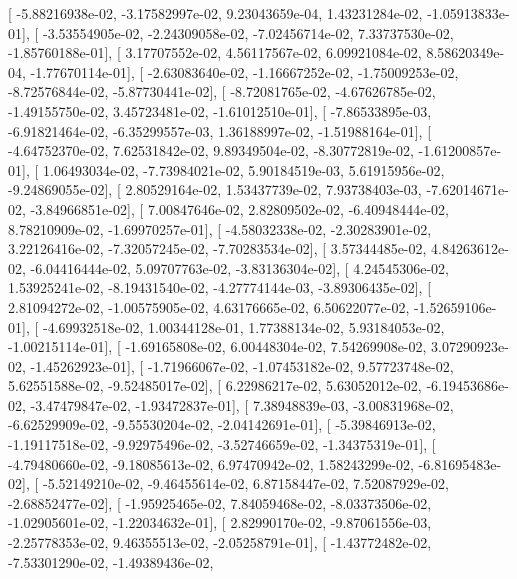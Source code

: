 \documentclass{article}
\begin{document}
       [ -5.88216938e-02,  -3.17582997e-02,   9.23043659e-04,
          1.43231284e-02,  -1.05913833e-01],
       [ -3.53554905e-02,  -2.24309058e-02,  -7.02456714e-02,
          7.33737530e-02,  -1.85760188e-01],
       [  3.17707552e-02,   4.56117567e-02,   6.09921084e-02,
          8.58620349e-04,  -1.77670114e-01],
       [ -2.63083640e-02,  -1.16667252e-02,  -1.75009253e-02,
         -8.72576844e-02,  -5.87730441e-02],
       [ -8.72081765e-02,  -4.67626785e-02,  -1.49155750e-02,
          3.45723481e-02,  -1.61012510e-01],
       [ -7.86533895e-03,  -6.91821464e-02,  -6.35299557e-03,
          1.36188997e-02,  -1.51988164e-01],
       [ -4.64752370e-02,   7.62531842e-02,   9.89349504e-02,
         -8.30772819e-02,  -1.61200857e-01],
       [  1.06493034e-02,  -7.73984021e-02,   5.90184519e-03,
          5.61915956e-02,  -9.24869055e-02],
       [  2.80529164e-02,   1.53437739e-02,   7.93738403e-03,
         -7.62014671e-02,  -3.84966851e-02],
       [  7.00847646e-02,   2.82809502e-02,  -6.40948444e-02,
          8.78210909e-02,  -1.69970257e-01],
       [ -4.58032338e-02,  -2.30283901e-02,   3.22126416e-02,
         -7.32057245e-02,  -7.70283534e-02],
       [  3.57344485e-02,   4.84263612e-02,  -6.04416444e-02,
          5.09707763e-02,  -3.83136304e-02],
       [  4.24545306e-02,   1.53925241e-02,  -8.19431540e-02,
         -4.27774144e-03,  -3.89306435e-02],
       [  2.81094272e-02,  -1.00575905e-02,   4.63176665e-02,
          6.50622077e-02,  -1.52659106e-01],
       [ -4.69932518e-02,   1.00344128e-01,   1.77388134e-02,
          5.93184053e-02,  -1.00215114e-01],
       [ -1.69165808e-02,   6.00448304e-02,   7.54269908e-02,
          3.07290923e-02,  -1.45262923e-01],
       [ -1.71966067e-02,  -1.07453182e-02,   9.57723748e-02,
          5.62551588e-02,  -9.52485017e-02],
       [  6.22986217e-02,   5.63052012e-02,  -6.19453686e-02,
         -3.47479847e-02,  -1.93472837e-01],
       [  7.38948839e-03,  -3.00831968e-02,  -6.62529909e-02,
         -9.55530204e-02,  -2.04142691e-01],
       [ -5.39846913e-02,  -1.19117518e-02,  -9.92975496e-02,
         -3.52746659e-02,  -1.34375319e-01],
       [ -4.79480660e-02,  -9.18085613e-02,   6.97470942e-02,
          1.58243299e-02,  -6.81695483e-02],
       [ -5.52149210e-02,  -9.46455614e-02,   6.87158447e-02,
          7.52087929e-02,  -2.68852477e-02],
       [ -1.95925465e-02,   7.84059468e-02,  -8.03373506e-02,
         -1.02905601e-02,  -1.22034632e-01],
       [  2.82990170e-02,  -9.87061556e-03,  -2.25778353e-02,
          9.46355513e-02,  -2.05258791e-01],
       [ -1.43772482e-02,  -7.53301290e-02,  -1.49389436e-02,
\end{document}
